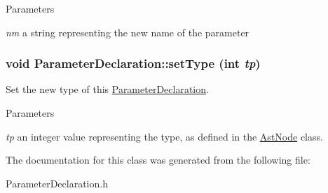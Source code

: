 \begin{DoxyParams}{Parameters}
\item[{\em nm}]a string representing the new name of the parameter \end{DoxyParams}
\hypertarget{classParameterDeclaration_aee125114f14e0bcfaa15753d6b1379cf}{
\subsubsection[{setType}]{\setlength{\rightskip}{0pt plus 5cm}void ParameterDeclaration::setType (int {\em tp})}}
\label{classParameterDeclaration_aee125114f14e0bcfaa15753d6b1379cf}
Set the new type of this \hyperlink{classParameterDeclaration}{ParameterDeclaration}.


\begin{DoxyParams}{Parameters}
\item[{\em tp}]an integer value representing the type, as defined in the \hyperlink{classAstNode}{AstNode} class. \end{DoxyParams}


The documentation for this class was generated from the following file:\begin{DoxyCompactItemize}
\item 
ParameterDeclaration.h\end{DoxyCompactItemize}
